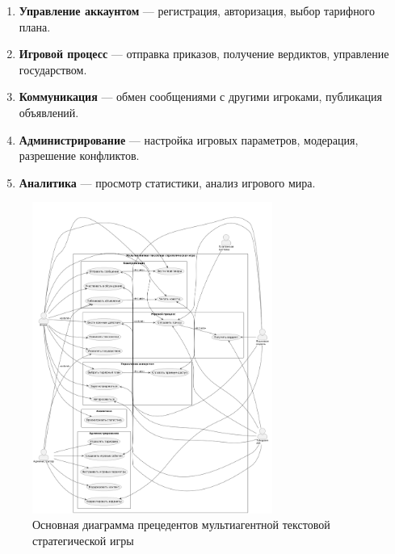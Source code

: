 \begin{enumerate}
    \item \textbf{Управление аккаунтом} — регистрация, авторизация, выбор тарифного плана.

    \item \textbf{Игровой процесс} — отправка приказов, получение вердиктов, управление государством.

    \item \textbf{Коммуникация} — обмен сообщениями с другими игроками, публикация объявлений.

    \item \textbf{Администрирование} — настройка игровых параметров, модерация, разрешение конфликтов.

    \item \textbf{Аналитика} — просмотр статистики, анализ игрового мира.
\end{enumerate}
\begin{figure}[h]
    \centering
    \includegraphics[width=0.7\textwidth]{figures/use-case-diagram.png}
    \caption{Основная диаграмма прецедентов мультиагентной текстовой стратегической игры}
    \label{fig:main-use-case-diagram}
\end{figure}\\
~\\~\\~\\~\\~\\
\newpage
